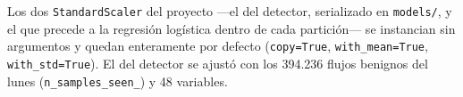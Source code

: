 Los dos \texttt{StandardScaler} del proyecto ---el del detector, serializado en \texttt{models/}, y el que precede a la regresión logística dentro de cada partición--- se instancian sin argumentos y quedan enteramente por defecto (\texttt{copy=True}, \texttt{with\_mean=True}, \texttt{with\_std=True}). El del detector se ajustó con los 394.236 flujos benignos del lunes (\texttt{n\_samples\_seen\_}) y 48 variables.
